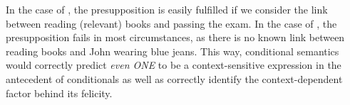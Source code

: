 \xe
In the case of , the presupposition is easily fulfilled if we consider the link between reading (relevant) books and passing the exam. In the case of , the presupposition fails in most circumstances, as there is no known link between reading books and John wearing blue jeans. This way,  conditional semantics would correctly predict \textit{even \MakeUppercase{one}} to be a context-sensitive expression in the antecedent of conditionals as well as correctly identify the context-dependent factor behind its felicity.

